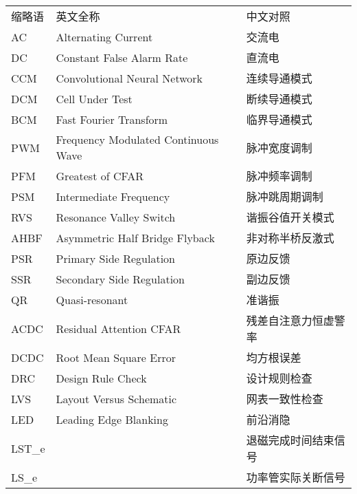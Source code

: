 \begin{center}
{
\renewcommand{\arraystretch}{1.28}
\begin{tabular}{p{2.5cm}p{6cm}l}
    缩略语 & 英文全称 &  中文对照 \\
    AC &  Alternating Current& 交流电\\
    DC &Constant False Alarm Rate &直流电\\
    CCM & Convolutional Neural Network & 连续导通模式 \\
    DCM & Cell Under Test & 断续导通模式\\
    BCM & Fast Fourier Transform & 临界导通模式 \\
    PWM & Frequency Modulated Continuous Wave & 脉冲宽度调制 \\
    PFM &  Greatest of CFAR & 脉冲频率调制\\
    PSM & Intermediate Frequency & 脉冲跳周期调制 \\
    RVS & Resonance Valley Switch & 谐振谷值开关模式\\
    AHBF& Asymmetric Half Bridge Flyback& 非对称半桥反激式\\
    PSR&  Primary Side Regulation & 原边反馈\\
    SSR &  Secondary Side Regulation & 副边反馈\\
    QR & Quasi-resonant & 准谐振\\
    ACDC &  Residual Attention CFAR & 残差自注意力恒虚警率\\
    DCDC & Root Mean Square Error & 均方根误差\\
    DRC & Design Rule Check & 设计规则检查\\
    LVS &  Layout Versus Schematic & 网表一致性检查\\
    LED & Leading Edge Blanking & 前沿消隐\\
    LST\_e &  & 退磁完成时间结束信号 \\
    LS\_e  &  & 功率管实际关断信号 \\

    
\end{tabular}
}
\end{center}